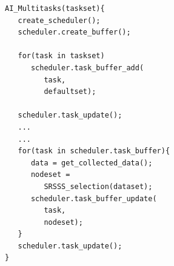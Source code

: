 \begin{lstlisting}[language={[ANSI]C},label=AI,
	caption={An example of AI selection and Muti-tasks},
	keywordstyle=\color{blue!70},
	showstringspaces=false,
	commentstyle=\color{red!50!green!80!blue!70},
	frame=single,captionpos=t,
	rulesepcolor=\color{red!20!green!20!blue!20},
	basicstyle=\ttfamily]
AI_Multitasks(taskset){
   create_scheduler();
   scheduler.create_buffer();

   for(task in taskset)
      scheduler.task_buffer_add(
         task,
         defaultset);

   scheduler.task_update();
   ...
   ...
   for(task in scheduler.task_buffer){
      data = get_collected_data();
      nodeset =
         SRSSS_selection(dataset);
      scheduler.task_buffer_update(
         task,
         nodeset);
   }
   scheduler.task_update();
}

\end{lstlisting}

